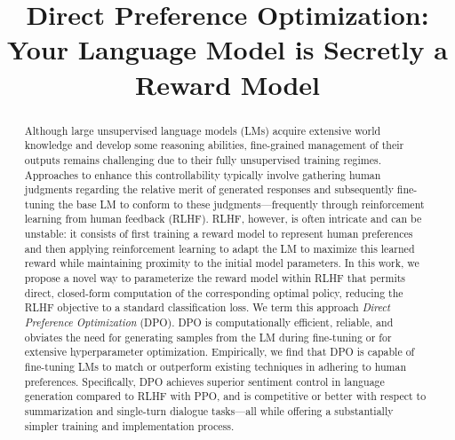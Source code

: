 \title{Direct Preference Optimization: Your Language Model is Secretly a Reward Model}

\begin{abstract}
Although large unsupervised language models (LMs) acquire extensive world knowledge and develop some reasoning abilities, fine-grained management of their outputs remains challenging due to their fully unsupervised training regimes. Approaches to enhance this controllability typically involve gathering human judgments regarding the relative merit of generated responses and subsequently fine-tuning the base LM to conform to these judgments—frequently through reinforcement learning from human feedback (RLHF). RLHF, however, is often intricate and can be unstable: it consists of first training a reward model to represent human preferences and then applying reinforcement learning to adapt the LM to maximize this learned reward while maintaining proximity to the initial model parameters. In this work, we propose a novel way to parameterize the reward model within RLHF that permits direct, closed-form computation of the corresponding optimal policy, reducing the RLHF objective to a standard classification loss. We term this approach \textit{Direct Preference Optimization} (DPO). DPO is computationally efficient, reliable, and obviates the need for generating samples from the LM during fine-tuning or for extensive hyperparameter optimization. Empirically, we find that DPO is capable of fine-tuning LMs to match or outperform existing techniques in adhering to human preferences. Specifically, DPO achieves superior sentiment control in language generation compared to RLHF with PPO, and is competitive or better with respect to summarization and single-turn dialogue tasks—all while offering a substantially simpler training and implementation process.
\end{abstract}

